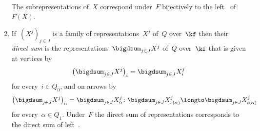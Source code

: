 \begin{remark}
\begin{enumerate}
      The subrepresentations of~$X$ correspond under~$F$ bijectively to the left~{} of~$F(X)$.
    \item
      If~$(X^j)_{j \in J}$ is a family of representations~$X^j$ of~$Q$ over~$\kf$ then their \emph{direct sum} is the representations~$\bigdsum_{j \in J} X^j$ of~$Q$ over~$\kf$ that is given at vertices by
      \[
          \left( \bigdsum_{j \in J} X^j \right)_i
        = \bigdsum_{j \in J} X^j_i
      \]
      for every~$i \in Q_0$, and on arrows by
      \[
                \left( \bigdsum_{j \in J} X^j \right)_\alpha
        =       \bigdsum_{j \in J} X^j_\alpha
        \colon  \bigdsum_{j \in J} X^j_{s(\alpha)}
        \longto \bigdsum_{j \in J} X^j_{t(\alpha)}
      \]
      for every~$\alpha \in Q_1$.
      Under~$F$ the direct sum of representations corresponds to the direct sum of left~{}.
  \end{enumerate}
\end{remark}




